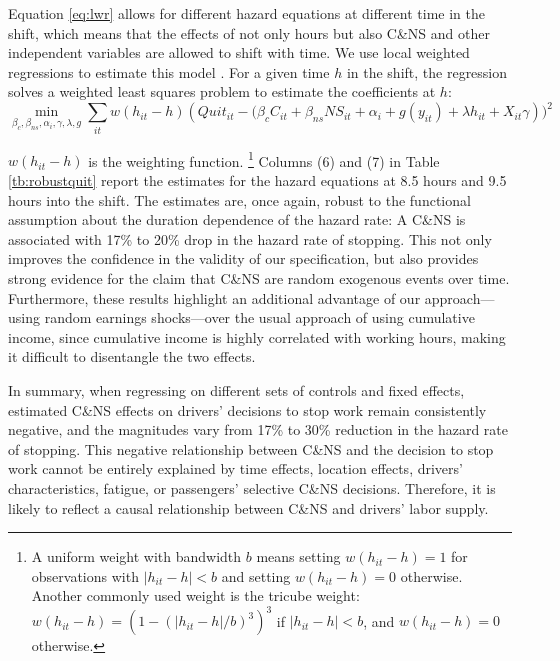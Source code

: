 \documentclass[reviewmode,AEJ]{AEA}
\begin{document}
Equation \eqref{eq:lwr} allows for different hazard equations at different time in the shift, which means that the effects of not only hours but also C\&NS and other independent variables are allowed to shift with time. We use local weighted regressions to estimate this model \citep{cleveland1988locally}. For a given time $h$ in the shift, the regression solves a weighted least squares problem to estimate the coefficients at $h$:
\[\min_{\beta_c, \beta_{ns}, \alpha_i, \gamma, \lambda, g} \sum_{it} w(h_{it}-h) \left(Quit_{it} - (\beta_cC_{it} + \beta_{ns}{NS}_{it} + \alpha_i + g(y_{it}) + \lambda h_{it} + X_{it}\gamma\right))^2\]

$w(h_{it}-h)$ is the weighting function.%
\footnote{A uniform weight with bandwidth $b$ means setting $w(h_{it}-h) = 1$ for observations with $|h_{it}-h|<b$ and setting $w(h_{it}-h) = 0$ otherwise. Another commonly used weight is the tricube weight: $w(h_{it}-h) = \left(1-(|h_{it}-h|/b)^3\right)^3$ if $|h_{it}-h|<b$, and $w(h_{it}-h) = 0$ otherwise.} 
Columns (6) and (7) in Table \ref{tb:robustquit} report the estimates for the hazard equations at 8.5 hours and 9.5 hours into the shift. The estimates are, once again, robust to the functional assumption about the duration dependence of the hazard rate: A C\&NS is associated with 17\% to 20\% drop in the hazard rate of stopping.  This not only improves the confidence in the validity of our specification, but also provides strong evidence for the claim that C\&NS are random exogenous events over time. Furthermore, these results highlight an additional advantage of our approach---using random earnings shocks---over the usual approach of using cumulative income, since cumulative income is highly correlated
with working hours, making it difficult to disentangle the two effects.  


In summary, when regressing on different sets of controls and fixed effects, estimated C\&NS effects on
drivers' decisions to stop work remain consistently negative, and the magnitudes vary
from 17\% to 30\% reduction in the hazard rate of stopping. This negative relationship between C\&NS and the decision to stop work cannot
be entirely explained by time effects, location effects, drivers' characteristics, fatigue, or passengers' 
selective C\&NS decisions. Therefore, it is likely to reflect a causal relationship between C\&NS and 
drivers' labor supply.
\end{document}
